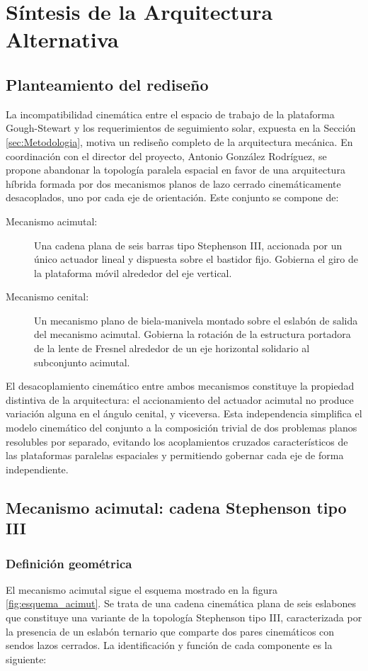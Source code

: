 \section{Síntesis de la Arquitectura Alternativa}

\subsection{Planteamiento del rediseño}
La incompatibilidad cinemática entre el espacio de trabajo de la plataforma Gough-Stewart y los requerimientos de seguimiento solar, expuesta en la Sección \ref{sec:Metodologia}, motiva un rediseño completo de la arquitectura mecánica. En coordinación con el director del proyecto, Antonio González Rodríguez, se propone abandonar la topología paralela espacial en favor de una arquitectura híbrida formada por dos mecanismos planos de lazo cerrado cinemáticamente desacoplados, uno por cada eje de orientación. Este conjunto se compone de:

\begin{description}
    \item[Mecanismo acimutal:] Una cadena plana de seis barras tipo Stephenson III, accionada por un único actuador lineal y dispuesta sobre el bastidor fijo. Gobierna el giro de la plataforma móvil alrededor del eje vertical.
    \item[Mecanismo cenital:] Un mecanismo plano de biela-manivela montado sobre el eslabón de salida del mecanismo acimutal. Gobierna la rotación de la estructura portadora de la lente de Fresnel alrededor de un eje horizontal solidario al subconjunto acimutal.
\end{description}

El desacoplamiento cinemático entre ambos mecanismos constituye la propiedad distintiva de la arquitectura: el accionamiento del actuador acimutal no produce variación alguna en el ángulo cenital, y viceversa. Esta independencia simplifica el modelo cinemático del conjunto a la composición trivial de dos problemas planos resolubles por separado, evitando los acoplamientos cruzados característicos de las plataformas paralelas espaciales y permitiendo gobernar cada eje de forma independiente.

\subsection{Mecanismo acimutal: cadena Stephenson tipo III}

\subsubsection{Definición geométrica}
\label{sec:def_geo_acimut}
El mecanismo acimutal sigue el esquema mostrado en la figura \ref{fig:esquema_acimut}. Se trata de una cadena cinemática plana de seis eslabones que constituye una variante de la topología Stephenson tipo III, caracterizada por la presencia de un eslabón ternario que comparte dos pares cinemáticos con sendos lazos cerrados. La identificación y función de cada componente es la siguiente:

